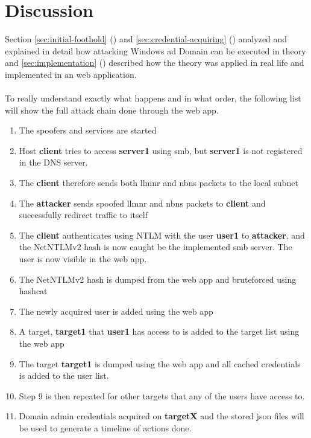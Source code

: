 \documentclass{article}
\begin{document}
\section{Discussion}
Section \ref{sec:initial-foothold} () and \ref{sec:credential-acquiring} () analyzed and explained in detail how attacking Windows \gls{ad} Domain can be executed in theory and \ref{sec:implementation} () described how the theory was applied in real life and implemented in an web application.
\\\\
To really understand exactly what happens and in what order, the following list will show the full attack chain done through the web app.

\begin{enumerate}
    \item The spoofers and services are started
    \item Host \textbf{client} tries to access \textbf{server1} using \gls{smb}, but \textbf{server1} is not registered in the DNS server.
    \item The \textbf{client} therefore sends both \gls{llmnr} and \gls{nbns} packets to the local subnet
    \item The \textbf{attacker} sends spoofed \gls{llmnr} and \gls{nbns} packets to \textbf{client} and successfully redirect traffic to itself
    \item The \textbf{client} authenticates using NTLM with the user \textbf{user1} to \textbf{attacker}, and the NetNTLMv2 hash is now caught be the implemented \gls{smb} server. The user is now visible in the web app.
    \item The NetNTLMv2 hash is dumped from the web app and bruteforced using hashcat
    \item The newly acquired user is added using the web app
    \item A target, \textbf{target1} that \textbf{user1} has access to is added to the target list using the web app
    \item The target \textbf{target1} is dumped using the web app and all cached credentials is added to the user list.
    \item Step 9 is then repeated for other targets that any of the users have access to.
    \item Domain admin credentials acquired on \textbf{targetX} and the stored \gls{json} files will be used to generate a timeline of actions done.
\end{enumerate}
\end{document}
